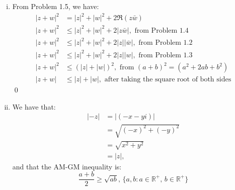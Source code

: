 \documentclass[a4paper, titlepage, DIV=14]{scrartcl}
\begin{document}
\begin{enumerate}
\begin{enumerate}[i)]
            LHS:
            \begin{align*}
                |z+w|^{2} &= (z+w)\overline{z+w} \\
                    &= (z+w)(\bar{z}+\bar{w}), \text{ as proven in Problem 1.1} \\
                    &= z\bar{z} + z\bar{w} + w\bar{z} + w\bar{w} \\
                    &= |z|^{2} + z\bar{w} + w\bar{z} + |w|^{2} \\
                    &= |z|^{2} + |w|^{2} + (x+yi)(u-vi) + (u+vi)(x-yi) \\
                    &= |z|^{2} + |w|^{2} + (xu+yv)+(-xv+yu)i + (ux + yv) + (-yu+xv)i \\
                    &= |z|^{2} + |w|^{2} + (xu+yv)+\cancel{(yu-xv)i} + (xu+yv) \cancel{-(yu-xv)i} \\
                    &= |z|^{2} + |w|^{2} + 2(xu+yv) \\
                    &= |z|^{2} + |w|^{2} + 2\Re(z\bar{w}), \text{ using the result above} \\
                    &= \text{RHS}
            \end{align*}\qed
            
            \item From Problem 1.5, we have:
            \begin{align*}
                |z + w|^{2} &= |z|^{2} + |w|^{2} + 2\Re(z\bar{w}) \\
                |z + w|^{2} &\leq |z|^{2} + |w|^{2} + 2|z\bar{w}|, \text{ from Problem 1.4}\\
                |z + w|^{2} &\leq |z|^{2} +|w|^{2} + 2|z||\bar{w}|, \text{ from Problem 1.2} \\
                |z + w|^{2} &\leq |z|^{2} +|w|^{2} + 2|z||w|, \text{ from Problem 1.3} \\
                |z + w|^{2} &\leq (|z| + |w|)^{2}, \text{ from }(a+b)^{2} = (a^{2}+2ab+b^{2}) \\
                |z + w| &\leq |z| + |w|, \text{ after taking the square root of both sides}
            \end{align*} \qed
            
            \item We have that:
            \begin{align}
                |-z| &= |(-x-yi)| \nonumber \\    
                    &= \sqrt{(-x)^{2}+(-y)^{2}} \nonumber \\ 
                    &= \sqrt{x^{2}+y^{2}} \nonumber \\ 
                    &= |z|, \label{eq:-z}
            \end{align} and that the AM-GM inequality is:
            \begin{equation}
                \frac{a+b}{2} \geq \sqrt{ab}, \, \{a, b: a\in \mathbb{R}^{+}, \, b\in \mathbb{R}^{+}\}
            \end{equation}
            

\end{enumerate}
\end{enumerate}
\end{document}
